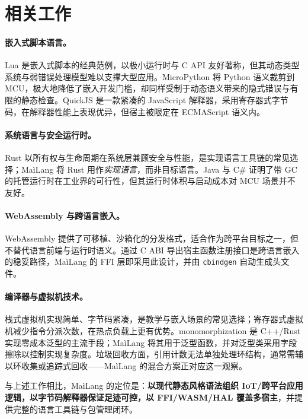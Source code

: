 \documentclass[10pt,a4paper]{article}
\begin{document}
\section{相关工作}
\label{sec:related}

\paragraph{嵌入式脚本语言。}
Lua 是嵌入式脚本的经典范例，以极小运行时与 C API 友好著称\cite{lua}，但其动态类型系统与弱错误处理模型难以支撑大型应用。MicroPython 将 Python 语义裁剪到 MCU，极大地降低了嵌入开发门槛\cite{micropython}，却同样受制于动态语义带来的隐式错误与有限的静态检查。QuickJS 是一款紧凑的 JavaScript 解释器，采用寄存器式字节码，在解释器性能上表现优异\cite{quickjs}，但宿主被限定在 ECMAScript 语义内。

\paragraph{系统语言与安全运行时。}
Rust 以所有权与生命周期在系统层兼顾安全与性能\cite{rust}，是实现语言工具链的常见选择；MaìLang 将 Rust 用作\emph{实现语言}，而非目标语言。Java 与 C\# 证明了带 GC 的托管运行时在工业界的可行性\cite{java,csharp}，但其运行时体积与启动成本对 MCU 场景并不友好。

\paragraph{WebAssembly 与跨语言嵌入。}
WebAssembly 提供了可移植、沙箱化的分发格式\cite{wasm}，适合作为跨平台目标之一，但不替代语言前端与运行时语义。通过 C ABI 导出宿主函数注册接口是跨语言嵌入的稳妥路径\cite{ffi}，MaìLang 的 FFI 层即采用此设计，并由 \texttt{cbindgen} 自动生成头文件。

\paragraph{编译器与虚拟机技术。}
栈式虚拟机实现简单、字节码紧凑，是教学与嵌入场景的常见选择；寄存器式虚拟机减少指令分派次数，在热点负载上更有优势\cite{vm-design}。monomorphization 是 C++/Rust 实现零成本泛型的主流手段\cite{generics}；MaìLang 将其用于泛型函数，并对泛型类采用字段擦除以控制实现复杂度。垃圾回收方面，引用计数无法单独处理环结构，通常需辅以环收集或追踪式回收\cite{gc}——MaìLang 的混合方案正对应这一观察。

与上述工作相比，MaìLang 的定位是：\textbf{以现代静态风格语法组织 IoT/跨平台应用逻辑，以字节码解释器保证足迹可控，以 FFI/WASM/HAL 覆盖多宿主}，并提供完整的语言工具链与包管理闭环。
\end{document}
